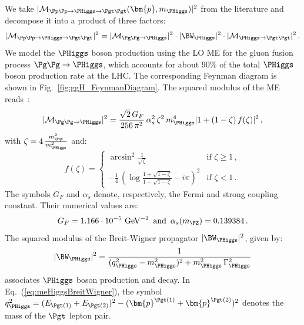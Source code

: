 We take $\vert \mathcal{M}_{\Pp\Pp \to \PHiggs \to
  \Pgt\Pgt}(\bm{p},m_{\PHiggs}) \vert^{2}$ from the literature
and decompose it into a product of three factors:
\begin{equation}
\vert \mathcal{M}_{\Pp\Pp \to \PHiggs \to \Pgt\Pgt} \vert^{2} =
 \vert \mathcal{M}_{\Pg\Pg \to \PHiggs} \vert^{2} 
\cdot \vert \BW_{\PHiggs} \vert^{2} 
\cdot \vert \mathcal{M}_{\PHiggs \to \Pgt\Pgt} \vert^{2} \, .
\label{eq:meHiggsProduction_and_Decay}
\end{equation}
We model the $\PHiggs$ boson production using the LO ME for the gluon fusion process $\Pg\Pg \to \PHiggs$,
which accounts for about $90\%$ of the total $\PHiggs$ boson production rate at the LHC.
The corresponding Feynman diagram is shown in Fig.~\ref{fig:ggH_FeynmanDiagram}.
The squared modulus of the ME reads~\cite{me_ggHprod}:
\begin{equation}
\vert \mathcal{M}_{\Pg\Pg \to \PHiggs} \vert^{2} = 
 \frac{\sqrt{2} \, G_{F}}{256 \, \pi^{2}} \, \alpha_{s}^{2} \, \zeta^{2} \, m_{\PHiggs}^{4} \vert 1 + (1 - \zeta) \, f(\zeta) \vert^{2} \, ,
\label{eq:meHiggsProduction}
\end{equation}
with $\zeta = 4\, \frac{m_{\Pqt}^{2}}{m_{\PHiggs}^{2}}$ and:
\begin{equation}
f(\zeta) = 
\begin{cases} 
\arcsin^{2} \frac{1}{\sqrt{\zeta}}  & \mbox{if } \zeta \geq 1 \, , \\
-\frac{1}{4} \, \left( \log\frac{1 + \sqrt{1 - \zeta}}{1 - \sqrt{1 - \zeta}} - i\pi \right)^{2} & \mbox{if } \zeta < 1 \, .
\end{cases}
\label{eq:meHiggsProduction_ftau}
\end{equation}
The symbols $G_{F}$ and $\alpha_{s}$ denote, respectively, the Fermi and
strong coupling constant. Their numerical values are:
\begin{equation} 
G_{F} = 1.166 \cdot 10^{-5}\mbox{~GeV}^{-2} \, \mbox{ and } \,
\alpha_{s}(m_{\PZ}) = 0.139384 \, .
\label{eq:def_G_F} 
\end{equation}
The squared modulus of the Breit-Wigner propagator $\vert
\BW_{\PHiggs} \vert^{2}$, given by:
\begin{equation}
\vert \BW_{\PHiggs} \vert^{2} = \frac{1}{(q_{\PHiggs}^{2} -
  m_{\PHiggs}^{2})^{2} + m_{\PHiggs}^{2} \, \Gamma_{\PHiggs}^{2}} 
\label{eq:meHiggsBreitWigner}
\end{equation}
associates $\PHiggs$ boson production and decay.
In Eq.~(\ref{eq:meHiggsBreitWigner}), the symbol
$q_{\PHiggs}^{2} = (E_{\Pgt(1)} + E_{\Pgt(2)})^{2} - (\bm{p}^{\Pgt(1)} + \bm{p}^{\Pgt(2)})^{2}$ denotes the mass of the $\Pgt$ lepton pair.
